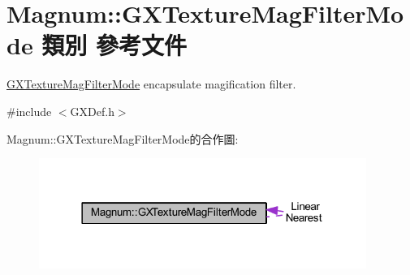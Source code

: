 \hypertarget{class_magnum_1_1_g_x_texture_mag_filter_mode}{}\section{Magnum\+:\+:G\+X\+Texture\+Mag\+Filter\+Mode 類別 參考文件}
\label{class_magnum_1_1_g_x_texture_mag_filter_mode}


\hyperlink{class_magnum_1_1_g_x_texture_mag_filter_mode}{G\+X\+Texture\+Mag\+Filter\+Mode} encapsulate magification filter.  




{\ttfamily \#include $<$G\+X\+Def.\+h$>$}



Magnum\+:\+:G\+X\+Texture\+Mag\+Filter\+Mode的合作圖\+:\nopagebreak
\begin{figure}[H]
\begin{center}
\leavevmode
\includegraphics[width=302pt]{class_magnum_1_1_g_x_texture_mag_filter_mode__coll__graph}
\end{center}
\end{figure}
